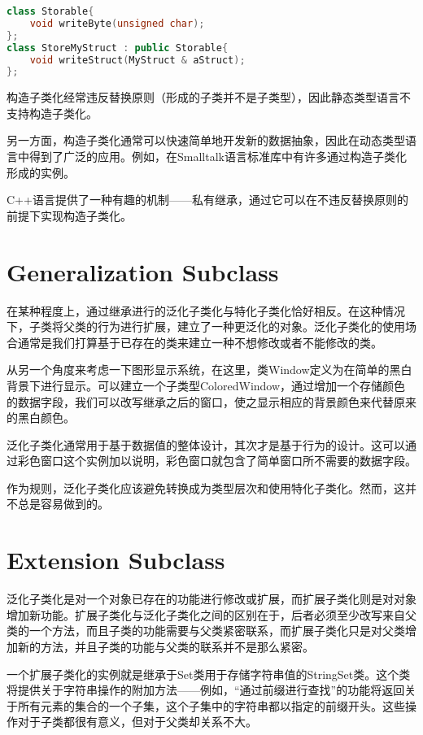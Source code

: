 \begin{lstlisting}[language=C++]
class Storable{
	void writeByte(unsigned char);
};
class StoreMyStruct : public Storable{
	void writeStruct(MyStruct & aStruct);
};
\end{lstlisting}

构造子类化经常违反替换原则（形成的子类并不是子类型），因此静态类型语言不支持构造子类化。

另一方面，构造子类化通常可以快速简单地开发新的数据抽象，因此在动态类型语言中得到了广泛的应用。例如，在Smalltalk语言标准库中有许多通过构造子类化形成的实例。

C++语言提供了一种有趣的机制——私有继承，通过它可以在不违反替换原则的前提下实现构造子类化。

\section{Generalization Subclass}

在某种程度上，通过继承进行的泛化子类化与特化子类化恰好相反。在这种情况下，子类将父类的行为进行扩展，建立了一种更泛化的对象。泛化子类化的使用场合通常是我们打算基于已存在的类来建立一种不想修改或者不能修改的类。

从另一个角度来考虑一下图形显示系统，在这里，类Window定义为在简单的黑白背景下进行显示。可以建立一个子类型ColoredWindow，通过增加一个存储颜色的数据字段，我们可以改写继承之后的窗口，使之显示相应的背景颜色来代替原来的黑白颜色。

泛化子类化通常用于基于数据值的整体设计，其次才是基于行为的设计。这可以通过彩色窗口这个实例加以说明，彩色窗口就包含了简单窗口所不需要的数据字段。

作为规则，泛化子类化应该避免转换成为类型层次和使用特化子类化。然而，这并不总是容易做到的。



\section{Extension Subclass}

泛化子类化是对一个对象已存在的功能进行修改或扩展，而扩展子类化则是对对象增加新功能。扩展子类化与泛化子类化之间的区别在于，后者必须至少改写来自父类的一个方法，而且子类的功能需要与父类紧密联系，而扩展子类化只是对父类增加新的方法，并且子类的功能与父类的联系并不是那么紧密。

一个扩展子类化的实例就是继承于Set类用于存储字符串值的StringSet类。这个类将提供关于字符串操作的附加方法——例如，“通过前缀进行查找”的功能将返回关于所有元素的集合的一个子集，这个子集中的字符串都以指定的前缀开头。这些操作对于子类都很有意义，但对于父类却关系不大。

